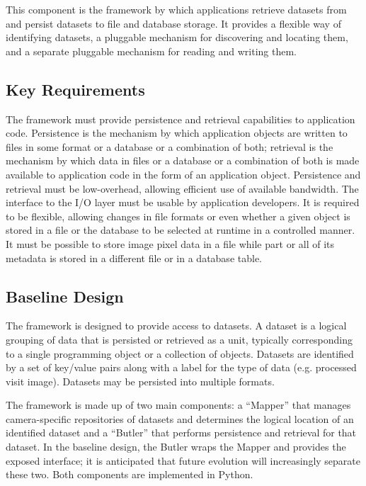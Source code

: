 \documentclass[DM,lsstdraft,toc]{lsstdoc}
\begin{document}
This component is the framework by which applications retrieve datasets from
and persist datasets to file and database storage.  It provides a flexible way
of identifying datasets, a pluggable mechanism for discovering and locating
them, and a separate pluggable mechanism for reading and writing them.

\subsection{Key Requirements}\label{butler-requirements}

The framework must provide persistence and retrieval capabilities to
application code. Persistence is the mechanism by which application
objects are written to files in some format or a database or a
combination of both; retrieval is the mechanism by which data in files
or a database or a combination of both is made available to application
code in the form of an application object. Persistence and retrieval
must be low-overhead, allowing efficient use of available bandwidth. The
interface to the I/O layer must be usable by application developers. It
is required to be flexible, allowing changes in file formats or even
whether a given object is stored in a file or the database to be
selected at runtime in a controlled manner. It must be possible to store
image pixel data in a file while part or all of its metadata is stored
in a different file or in a database table.

\subsection{Baseline Design}\label{butler-design}

The framework is designed to provide access to datasets. A dataset is a logical
grouping of data that is persisted or retrieved as a unit, typically
corresponding to a single programming object or a collection of objects.
Datasets are identified by a set of key/value pairs along with a label for the
type of data (e.g. processed visit image).  Datasets may be persisted into
multiple formats.

The framework is made up of two main components: a ``Mapper'' that manages
camera-specific repositories of datasets and determines the
logical location of an identified dataset and a ``Butler'' that performs
persistence and retrieval for that dataset.  In the baseline design, the Butler
wraps the Mapper and provides the exposed interface; it is anticipated that
future evolution will increasingly separate these two.  Both components are
implemented in Python.
\end{document}
